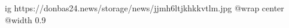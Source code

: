  
 
 
 
 

\ifcmt
  ig https://donbas24.news/storage/news/jjmh6ltjkhkkvtlm.jpg
  @wrap center
  @width 0.9
\fi
